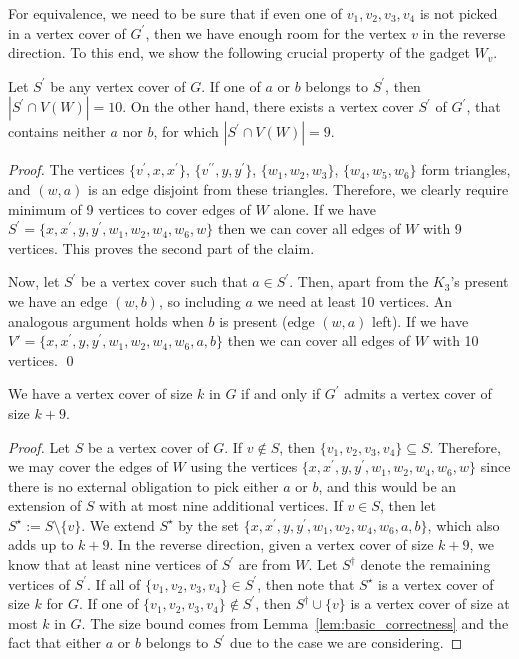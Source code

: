 \documentclass[svgnames]{llncs}
\begin{document}
{For equivalence, we need to be sure that if even one of $v_1, v_2, v_3, v_4$ is not picked in a vertex cover of $G^\prime$, then we have enough room for the vertex $v$ 
in the reverse direction. To this end, we show the following crucial property of the gadget $W_v$.

\begin{lemma}
\label{lem:basic_correctness}
Let $S^\prime$ be any vertex cover of $G$. If one of $a$ or $b$ belongs to $S^\prime$, then $|S^\prime \cap V(W)| = 10$. On the other hand, there exists a vertex cover  $S^\prime$ of $G^\prime$, that contains neither $a$ nor $b$, for which $|S^\prime \cap V(W)| = 9$. 
\label{W1vc}
\end{lemma}
\begin{proof}
The vertices $\{v^\prime,x,x^\prime\}$, $\{v^{\prime\prime},y,y^\prime\}$, $\{w_1,w_2,w_3\}$, $\{w_4,w_5,w_6\}$ form triangles, and $(w,a)$ is an edge disjoint from these triangles. 
Therefore, we clearly require minimum of 9 vertices to cover edges of $W$ alone. If we have $S^\prime=\{x,x^\prime,y,y^\prime,w_1,w_2,w_4,w_6,w\}$ then we can cover all edges of $W$ with 9 vertices. 
This proves the second part of the claim. 

Now, let $S^\prime$ be a vertex cover such that $a \in S^\prime$. Then, apart from the $K_3$'s present we have an edge $(w,b)$, so including $a$ we need at least 10 vertices. 
An analogous argument holds when $b$ is present (edge $(w,a)$ left).
If we have $V'=\{x,x^\prime,y,y^\prime,w_1,w_2,w_4,w_6,a,b\}$ then we can cover all edges of $W$ with 10 vertices.
\qed
\end{proof}



\begin{corollary}We have a vertex cover of size $k$ in $G$ if and only if $G^\prime$ admits a vertex cover of size $k+9$. 
\end{corollary}


\begin{proof}
Let $S$ be a vertex cover of $G$. If $v \notin S$, then $\{v_1,v_2,v_3,v_4\} \subseteq S$. Therefore, we may cover the edges of $W$ using the vertices $\{x,x^\prime,y,y^\prime,w_1,w_2,w_4,w_6,w\}$ since 
there is no external obligation to pick either $a$ or $b$, and this would be an extension of $S$ with at most nine additional vertices. If $v \in S$, then let $S^\star := S \setminus \{v\}$. We extend $S^\star$ by 
the set $\{x,x^\prime,y,y^\prime,w_1,w_2,w_4,w_6,a,b\}$, which also adds up to $k+9$. In the reverse direction, given a vertex cover of size $k+9$, we know that at least nine vertices of $S^\prime$ are from $W$.  
Let $S^\dagger$ denote the remaining vertices of $S^\prime$. If all of $\{v_1,v_2,v_3,v_4\} \in S^\prime$, then note that $S^\star$ is a vertex cover of size $k$ for $G$. If one of $\{v_1,v_2,v_3,v_4\} \notin S^\prime$, 
then $S^\dagger \cup \{v\}$ is a vertex cover of size at most $k$ in $G$. The size bound comes from Lemma~\ref{lem:basic_correctness} and the fact that either $a$ or $b$ 
belongs to $S^\prime$ due to the case we are considering. 
\end{proof}



}
\end{document}
